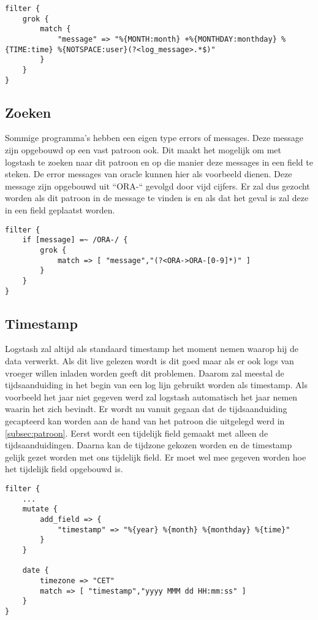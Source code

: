 \lstset{escapechar=@,style=customc}  
\begin{lstlisting}[frame=single]  
filter {
	grok {
		match {
			"message" => "%{MONTH:month} +%{MONTHDAY:monthday} %{TIME:time} %{NOTSPACE:user}(?<log_message>.*$)"	 
		}
	}
}
\end{lstlisting}

\subsection{Zoeken}
\label{subsec:zoeken}

Sommige programma’s hebben een eigen type errors of messages. Deze message zijn opgebouwd op een vast patroon ook. Dit maakt het mogelijk om met logstash te zoeken naar dit patroon en op die manier deze messages in een field te steken. De error messages van oracle kunnen hier als voorbeeld dienen. Deze message zijn opgebouwd uit “ORA-“ gevolgd door vijd cijfers. Er zal dus gezocht worden als dit patroon in de message te vinden is en als dat het geval is zal deze in een field geplaatst worden.

\lstset{escapechar=@,style=customc}  
\begin{lstlisting}[frame=single]  
filter {
	if [message] =~ /ORA-/ {
		grok {
			match => [ "message","(?<ORA->ORA-[0-9]*)" ]
		}  
	}
}
\end{lstlisting}

\subsection{Timestamp}
\label{subsec:timestamp}

Logstash zal altijd als standaard timestamp het moment nemen waarop hij de data verwerkt. Als dit live gelezen wordt is dit goed maar als er ook logs van vroeger willen inladen worden geeft dit problemen.  Daarom zal meestal de tijdsaanduiding in het begin van een log lijn gebruikt worden als timestamp. Als voorbeeld het jaar niet gegeven werd zal logstash automatisch het jaar nemen waarin het zich bevindt. Er wordt nu vanuit gegaan dat de tijdsaanduiding gecapteerd kan worden aan de hand van het patroon die uitgelegd werd in \ref{subsec:patroon}. Eerst wordt een tijdelijk field gemaakt met alleen de tijdsaanduidingen. Daarna kan de tijdzone gekozen worden en de timestamp gelijk gezet worden met ons tijdelijk field. Er moet wel mee gegeven worden hoe het tijdelijk field opgebouwd is. 

\lstset{escapechar=@,style=customc}  
\begin{lstlisting}[frame=single]  
filter {
	...
	mutate {
		add_field => {
			"timestamp" => "%{year} %{month} %{monthday} %{time}"
		}
	}

	date {
		timezone => "CET"
		match => [ "timestamp","yyyy MMM dd HH:mm:ss" ]  
	}
}
\end{lstlisting}

